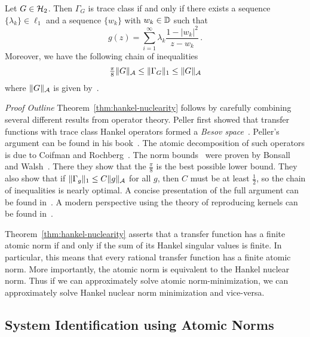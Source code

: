 \begin{theorem}\label{thm:hankel-nuclearity}
Let $G \in \mathcal{H}_2$.  Then $\Gamma_G$ is trace class if and only if there exists a sequence $\{\lambda_k\} \in \ell_1$ and a
    sequence $\{w_k\}$ with $w_k \in \mathbb{D}$ such that
\begin{equation}\label{eq:kernel-form}
    g(z) = \sum_{i=1}^\infty \lambda_k \frac{1-|w_k|^2}{z-w_k}\,.
    \end{equation}
Moreover, we have the following chain of inequalities
\begin{equation}\label{eq:norm-ineq-chain}
\tfrac{\pi}{8}\|G\|_{\mathcal{A}} \leq  \|\Gamma_G\|_1 \leq
\|G\|_{\mathcal{A}} 
\end{equation}
where  $\|G\|_{\mathcal{A}}$ is given by~.
\end{theorem}
\emph{Proof Outline}  Theorem~\ref{thm:hankel-nuclearity} follows by carefully combining several different results from operator theory. Peller first showed that transfer functions with trace class Hankel operators formed a \emph{Besov space}~\cite{Peller79}. Peller's argument can be found in his book~\cite{PellerHankelBook}. The atomic decomposition of such operators is due to Coifman and Rochberg~\cite{Coifman80}. The norm bounds~ were proven by Bonsall and Walsh~\cite{Bonsall86}. There they show that the $\tfrac{\pi}{8}$ is the best possible lower bound.  They also show that if $\|\Gamma_g\|_1\leq C\|g\|_{\mathcal{A}}$ for all $g$, then $C$ must be at least $\tfrac{1}{2}$, so the chain of inequalities is nearly optimal. A concise presentation of the full argument can be found  in~\cite{PartingtonHankelBook}. A modern perspective using the theory of reproducing kernels can be found in~\cite{ZhuBook}. 
\vspace{1mm}

\noindent Theorem~\ref{thm:hankel-nuclearity} asserts that a transfer function has a finite atomic norm if and only if the sum of its Hankel singular values is finite.  In particular, this means that every rational transfer function has a finite atomic norm.  More importantly, the atomic norm is equivalent to the Hankel nuclear norm.  Thus if we can approximately solve atomic norm-minimization, we can approximately solve Hankel nuclear norm minimization and vice-versa.

\subsection{System Identification using Atomic Norms}\label{sec:computation}

